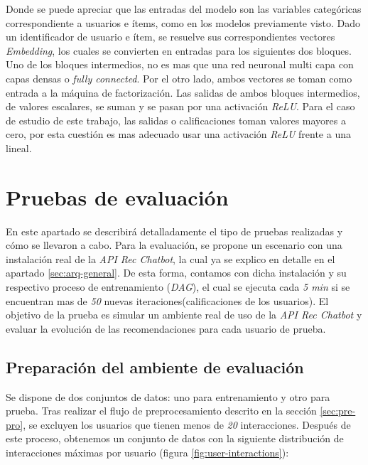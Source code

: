\documentclass[11pt,a4paper,twoside]{thesis}
\begin{document}
Donde se puede apreciar que las entradas del modelo son las variables
categóricas correspondiente a usuarios e ítems, como en los modelos previamente
visto. Dado un identificador de usuario e ítem, se resuelve sus correspondientes
vectores \textit{Embedding}, los cuales se convierten en entradas para los
siguientes dos bloques. Uno de los bloques intermedios, no es mas que una red
neuronal multi capa con capas densas o \textit{fully connected}. Por el otro
lado, ambos vectores se toman como entrada a la máquina de factorización. Las
salidas de ambos bloques intermedios, de valores escalares, se suman y se pasan
por una activación \textit{ReLU}. Para el caso de estudio de este trabajo, las
salidas o calificaciones toman valores mayores a cero, por esta cuestión es mas
adecuado usar una activación \textit{ReLU} frente a una lineal.


\chapter{Pruebas de evaluación}

En este apartado se describirá detalladamente el tipo de pruebas realizadas y cómo se llevaron a cabo. Para la evaluación, se propone un escenario con una instalación real de la \textit{API Rec Chatbot}, la cual ya se explico en detalle en el apartado \ref{sec:arq-general}. De esta forma, contamos con dicha instalación y su respectivo proceso de entrenamiento (\textit{DAG}), el cual se ejecuta cada \textit{5 min} si se encuentran mas de \textit{50} nuevas iteraciones(calificaciones de los usuarios). El objetivo de la prueba es simular un ambiente real de uso de la \textit{API Rec Chatbot} y evaluar la evolución de las recomendaciones para cada usuario de prueba.

\section{Preparación del ambiente de evaluación}

Se dispone de dos conjuntos de datos: uno para entrenamiento y otro para prueba. Tras realizar el flujo de preprocesamiento descrito en la sección \ref{sec:pre-pro}, se excluyen los usuarios que tienen menos de \textit{20} interacciones. Después de este proceso, obtenemos un conjunto de datos con la siguiente distribución de interacciones máximas por usuario (figura \ref{fig:user-interactions}):
\end{document}
